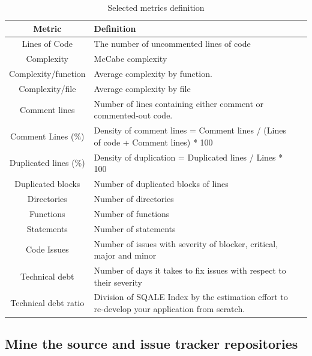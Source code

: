  \begin{table}[!hbt]
    \begin{center}
        \caption{Selected metrics definition}
        \label{tab:metrics_definition}
        \begin{tabular}{c| l l }
            \toprule
            \textbf{Metric} & \textbf{Definition} \\ \midrule
            Lines of Code & The number of uncommented lines of code    \\
            Complexity      & McCabe complexity    \\
            Complexity/function & Average complexity by function. \\
            Complexity/file & Average complexity by file \\
            Comment lines  & Number of lines containing either comment or commented-out code. \\
            Comment Lines (\%)   & Density of comment lines = Comment lines / (Lines of code + Comment lines) * 100    \\
            Duplicated lines (\%)     & Density of duplication = Duplicated lines / Lines * 100    \\
            Duplicated blocks   & Number of duplicated blocks of lines    \\
            Directories   & Number of directories    \\
            Functions         & Number of functions    \\
            Statements        & Number of statements   \\
            Code Issues       & Number of issues with severity of blocker, critical, major and minor   \\
            Technical debt    & Number of days it takes to fix issues with respect to their severity    \\
            Technical debt ratio   & Division of SQALE Index by the estimation effort to re-develop your application from scratch.    \\
        \end{tabular}
    \end{center}
 \end{table}

\subsection{Mine the source and issue tracker repositories}

